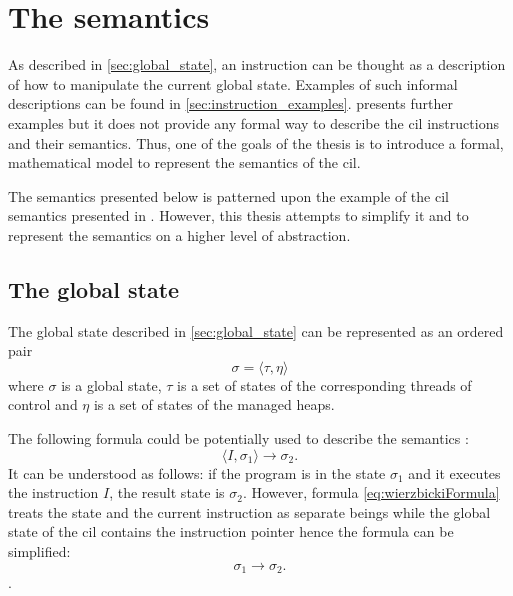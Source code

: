 \documentclass{article}
\numberwithin{equation}{section}
\begin{document}
\clearpage


\section{The semantics}

As described in \ref{sec:global_state}, an instruction can be thought as a description of how to manipulate the current global state. Examples of such informal descriptions can be found in \ref{sec:instruction_examples}. \cite{ecmaStandard} presents further examples but it does not provide any formal way to describe the \acrshort{cil} instructions and their semantics. Thus, one of the goals of the thesis is to introduce a formal, mathematical model to represent the semantics of the \acrshort{cil}.

The semantics presented below is patterned upon the example of the \acrshort{cil} semantics presented in \cite{zychlaThesis}. However, this thesis attempts to simplify it and to represent the semantics on a higher level of abstraction.

\subsection{The global state}

The global state described in \ref{sec:global_state} can be represented as an ordered pair
\begin{equation}
	\sigma = \langle\tau, \eta\rangle
\end{equation}
where $\sigma$ is a global state, $\tau$ is a set of states of the corresponding threads of control and $\eta$ is a set of states of the managed heaps.

The following formula could be potentially used to describe the semantics \cite{wierzbicki}:
\begin{equation}
\label{eq:wierzbickiFormula}
	\langle I, \sigma_1\rangle \rightarrow \sigma_2.
\end{equation}
It can be understood as follows: if the program is in the state $\sigma_1$ and it executes the instruction $I$, the result state is $\sigma_2$. However, formula \ref{eq:wierzbickiFormula} treats the state and the current instruction as separate beings while the global state of the \acrshort{cil} contains the instruction pointer hence the formula can be simplified:
\begin{equation}
\label{eq:wierzbickiFormula2}
	\sigma_1 \rightarrow \sigma_2.
\end{equation}.
\end{document}
